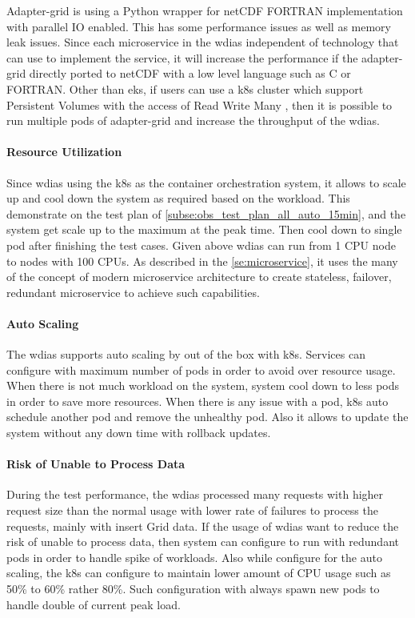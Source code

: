 Adapter-grid is using a Python wrapper for netCDF FORTRAN implementation with parallel IO enabled. This has some performance issues as well as memory leak issues. Since each microservice in the \acrshort{wdias} independent of technology that can use to implement the service, it will increase the performance if the adapter-grid directly ported to netCDF with a low level language such as C or FORTRAN.
Other than \acrshort{eks}, if users can use a \acrshort{k8s} cluster which support Persistent Volumes with the access of Read Write  Many \cite{LinuxFoundationPersistentKubernetes} , then it is possible to run multiple pods of adapter-grid and increase the throughput of the \acrshort{wdias}.

\paragraph{Resource Utilization}
Since \acrshort{wdias} using the \acrshort{k8s} as the container orchestration system, it allows to scale up and cool down the system as required based on the workload. This demonstrate on the test plan of \ref{subse:obs_test_plan_all_auto_15min}, and the system get scale up to the maximum at the peak time. Then cool down to single pod after finishing the test cases.
Given above \acrshort{wdias} can run from 1 CPU node to nodes with 100 CPUs. As described in the \ref{se:microservice}, it uses the many of the concept of modern microservice architecture to create stateless, failover, redundant microservice to achieve such capabilities.

\paragraph{Auto Scaling}
The \acrshort{wdias} supports auto scaling by out of the box with \acrshort{k8s}. Services can configure with maximum number of pods in order to avoid over resource usage. When there is not much workload on the system, system cool down to less pods in order to save more resources. When there is any issue with a pod, \acrshort{k8s} auto schedule another pod and remove the unhealthy pod. Also it allows to update the system without any down time with rollback updates.

\paragraph{Risk of Unable to Process Data}
During the test performance, the \acrshort{wdias} processed many requests with higher request size than the normal usage with lower rate of failures to process the requests, mainly with insert Grid data. If the usage of \acrshort{wdias} want to reduce the risk of unable to process data, then system can configure to run with redundant pods in order to handle spike of workloads. Also while configure for the auto scaling, the \acrshort{k8s} can configure to maintain lower amount of CPU usage such as 50\% to 60\% rather 80\%. Such configuration with always spawn new pods to handle double of current peak load.

